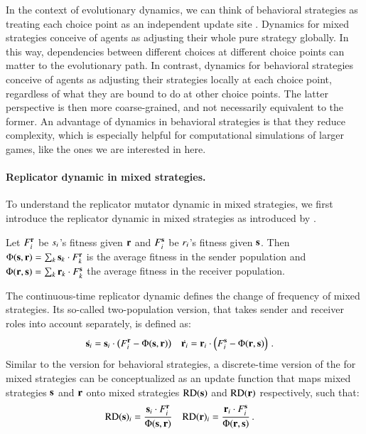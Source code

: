 In the context of evolutionary dynamics, we can think of behavioral
strategies as treating each choice point as an independent update site
\citep[e.g.][]{Cressman2003:Evolutionary-Dy,Sandholm2013:Population-Game}. Dynamics
for mixed strategies conceive of agents as adjusting their whole pure
strategy globally. In this way, dependencies between different choices
at different choice points can matter to the evolutionary path. In
contrast, dynamics for behavioral strategies conceive of agents as
adjusting their strategies locally at each choice point, regardless of
what they are bound to do at other choice points. The latter
perspective is then more coarse-grained, and not necessarily
equivalent to the former. An advantage of dynamics in behavioral
strategies is that they reduce complexity, which is especially helpful
for computational simulations of larger games, like the ones we are
interested in here.




\paragraph{Replicator dynamic in mixed strategies.} To understand the
replicator mutator dynamic in mixed strategies, we first introduce the
replicator dynamic in mixed strategies as introduced by
\citet{TaylorJonker1978:Evolutionary-St}. 

Let $F_i^{\mathrm{\mathbf{r}}}$ be $s_i$'s fitness given $\mathrm{\mathbf{r}}$ and
$F_i^{\mathrm{\mathbf{s}}}$ be $r_i$'s fitness given $\mathrm{\mathbf{s}}$. Then
$\Phi(\mathrm{\mathbf{s}},\mathrm{\mathbf{r}}) = \sum_{k} \mathrm{\mathbf{s}}_k \cdot F_k^{\mathrm{\mathbf{r}}}$ is
the average fitness in the sender population and
$\Phi(\mathrm{\mathbf{r}},\mathrm{\mathbf{s}}) = \sum_{k} \mathrm{\mathbf{r}}_k \cdot F_k^{\mathrm{\mathbf{s}}}$ the
average fitness in the receiver population.

The continuous-time replicator dynamic defines the change of frequency
of mixed strategies. Its so-called two-population version, that takes
sender and receiver roles into account separately, is defined as:
\begin{align*}
  \dot{\mathrm{\mathbf{s}}_i} & = \mathrm{\mathbf{s}}_i \cdot \left ( F_i^{\mathrm{\mathbf{r}}} -
  \Phi(\mathrm{\mathbf{s}},\mathrm{\mathbf{r}}) \right ) &   \dot{\mathrm{\mathbf{r}}_i} &  = \mathrm{\mathbf{r}}_i \cdot \left ( F_i^{\mathrm{\mathbf{s}}} -
  \Phi(\mathrm{\mathbf{r}},\mathrm{\mathbf{s}}) \right ) \,.
\end{align*}
Similar to the version for behavioral strategies, a discrete-time
version of the \rd for mixed strategies can be conceptualized as an
update function that maps mixed strategies $\mathrm{\mathbf{s}}$ and $\mathrm{\mathbf{r}}$
onto mixed strategies $\mathrm{RD}(\mathrm{\mathbf{s}})$ and $\mathrm{RD}(\mathrm{\mathbf{r}})$ respectively,
such that:
\begin{align*}
  \mathrm{RD}(\mathrm{\mathbf{s}})_i & = \frac{\mathrm{\mathbf{s}}_i \cdot F_i^{\mathrm{\mathbf{r}}}}{
    \Phi(\mathrm{\mathbf{s}},\mathrm{\mathbf{r}})} & \mathrm{RD}(\mathrm{\mathbf{r}})_i & = \frac{\mathrm{\mathbf{r}}_i \cdot
    F_i^{\mathrm{\mathbf{s}}}}{ \Phi(\mathrm{\mathbf{r}},\mathrm{\mathbf{s}})} \,.
\end{align*}



